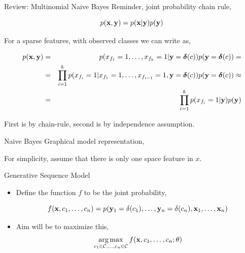\documentclass{beamer}
\begin{document}
\begin{frame}{Review: Multinomial Naive Bayes } 
  Reminder, joint probability chain rule,  

  \[ p(\mathbf{x}, \mathbf{y}) = p(\mathbf{x} | \mathbf{y}) p(\mathbf{y}) \] 


    \pause
  For a sparse features, with observed classes we can write as,
  
  \begin{eqnarray*}
    p(\mathbf{x}, \mathbf{y}) &=& p(x_{f_1}=1, \ldots, x_{f_k}=1 | \mathbf{y}=\boldsymbol{\delta}(c) ) p(\mathbf{y}=\boldsymbol{\delta}(c)) =\\
     &=& \prod_{i=1}^k p(x_{f_i}=1 | x_{f_1}=1, \ldots, x_{f_{i-1}}=1, \mathbf{y}=\boldsymbol{\delta}(c)) p(\mathbf{y}=\boldsymbol{\delta}(c)) \approx \\
     &=& \prod_{i=1}^k p(x_{f_i} =1| \mathbf{y}) p(\mathbf{y})  
  \end{eqnarray*}

  
  First is by chain-rule, second is by independence assumption.
\end{frame}


\begin{frame}{Naive Bayes}
  Graphical model representation,
  \begin{center}
  \end{center}
  For simplicity,  assume that there is only one space feature in $x$.
\end{frame}



\begin{frame}{Generative Sequence Model}
  \begin{itemize}
  \item Define the function $f$ to be the joint probability,

  \[ f(\mathbf{x}, c_1, \ldots, c_n) = p(\mathbf{y}_1=\delta(c_1), \ldots, \mathbf{y}_n=\delta(c_n), \mathbf{x}_1, \ldots, \mathbf{x}_n) \] 

  \air 

  \item Aim will be to maximize this,
    \[ \argmax_{c_1 \in \mcC, \ldots, c_n\in \mcC} f(\boldx, c_1, \ldots, c_n; \theta)\]
  \end{itemize}
 
\end{frame}
\end{document}

